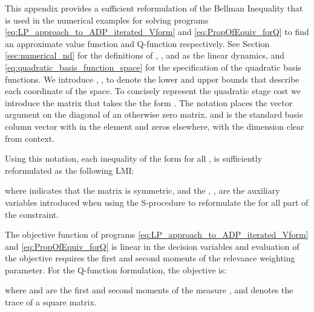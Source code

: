 \documentclass[journal]{IEEEtran}
\newcommand{\textQ}{Q}
\begin{document}
This appendix provides a sufficient reformulation of the Bellman Inequality that is used in the numerical examples for solving programs \eqref{eq:LP_approach_to_ADP_iterated_Vform} and \eqref{eq:PropOfEquiv_forQ} to find an approximate value function and \textQ-function respectively.
See Section \ref{sec:numerical_nd} for the definitions of , , and  as the linear dynamics, and \eqref{eq:quadratic_basis_function_space} for the specification of the quadratic basis functions.
We introduce , , to denote the lower and upper bounds that describe each coordinate of the  space.
To concisely represent the quadratic stage cost we introduce the matrix  that takes the the form .
The notation  places the vector argument on the diagonal of an otherwise zero matrix, and  is the standard basis column vector with  in the  element and zeros elsewhere, with the dimension clear from context.


Using this notation, each inequality of the form  for all ,  is sufficiently reformulated as the following LMI:
	
where  indicates that the matrix is symmetric, and the , , are the auxiliary variables introduced when using the S-procedure to reformulate the for all  part of the constraint.



The objective function of programs \eqref{eq:LP_approach_to_ADP_iterated_Vform} and \eqref{eq:PropOfEquiv_forQ} is linear in the decision variables and evaluation of the objective requires the first and second moments of the relevance weighting parameter. For the \textQ-function formulation, the objective is:
	
where  and  are the first and second moments of the measure , and  denotes the trace of a square matrix. 










\end{document}

